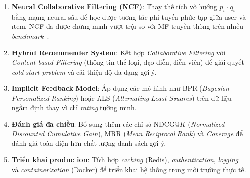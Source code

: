 \documentclass[../BTL.tex]{subfiles}
\begin{document}
\begin{enumerate}[itemsep=0.5em]
    \item \textbf{Neural Collaborative Filtering (NCF)}: Thay thế tích vô
    hướng $p_u \cdot q_i$ bằng mạng neural sâu để học được tương tác phi
    tuyến phức tạp giữa user và item. NCF đã được chứng minh vượt trội so
    với MF truyền thống trên nhiều \textit{benchmark}~\cite{he2017neural}.

    \item \textbf{Hybrid Recommender System}: Kết hợp \textit{Collaborative
    Filtering} với \textit{Content-based Filtering} (thông tin thể loại, đạo
    diễn, diễn viên) để giải quyết \textit{cold start problem} và cải thiện
    độ đa dạng gợi ý.

    \item \textbf{Implicit Feedback Model}: Áp dụng các mô hình như BPR
    (\textit{Bayesian Personalized Ranking}) hoặc ALS
    (\textit{Alternating Least Squares}) trên dữ liệu ngầm định thay vì
    chỉ \textit{rating} tường minh.

    \item \textbf{Đánh giá đa chiều}: Bổ sung thêm các chỉ số
    NDCG@$K$ (\textit{Normalized Discounted Cumulative Gain}),
    MRR (\textit{Mean Reciprocal Rank}) và \textit{Coverage} để đánh giá
    toàn diện hơn chất lượng danh sách gợi ý.

    \item \textbf{Triển khai production}: Tích hợp \textit{caching} (Redis),
    \textit{authentication}, \textit{logging} và \textit{containerization}
    (Docker) để triển khai hệ thống trong môi trường thực tế.
\end{enumerate}
\end{document}
